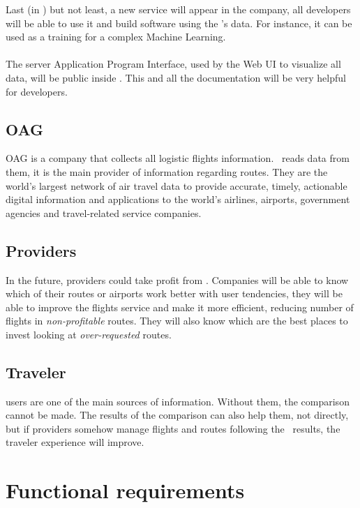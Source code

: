 Last (in \company) but not least, a new service will appear in the company, all developers will be able to use it and build software using the \thesis's data. For instance, it can be used as a training for a complex Machine Learning\cite{machine_learning_coursera}.
\\\\
The server Application Program Interface, used by the Web UI to visualize all data, will be public inside \company. This and all the documentation will be very helpful for developers.

\subsection{OAG} \label{sh_oag}

OAG is a company that collects all logistic flights information. \squad\ reads data from them, it is the main provider of information regarding routes. They are the world's largest network of air travel data to provide accurate, timely, actionable digital information and applications to the world's airlines, airports, government agencies and travel-related service companies\cite{oag}.

\subsection{Providers} \label{providers}

In the future, providers could take profit from \thesis. Companies will be able to know which of their routes or airports work better with user tendencies, they will be able to improve the flights service and make it more efficient, reducing number of flights in \textit{non-profitable} routes. They will also know which are the best places to invest looking at \textit{over-requested} routes.

\subsection{Traveler}

\company users are one of the main sources of information. Without them, the comparison cannot be made. The results of the comparison can also help them, not directly, but if providers somehow manage flights and routes following the \thesis\ results, the traveler experience will improve.


\section{Functional requirements}

